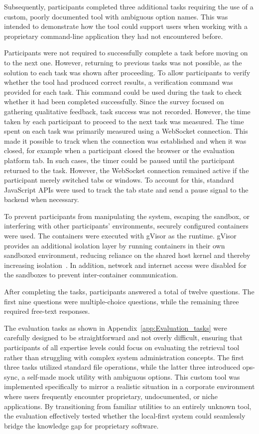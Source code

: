Subsequently, participants completed three additional tasks requiring the use of a custom, poorly documented tool with ambiguous option names. This was intended to demonstrate how the tool could support users when working with a proprietary command-line application they had not encountered before.

Participants were not required to successfully complete a task before moving on to the next one. However, returning to previous tasks was not possible, as the solution to each task was shown after proceeding. To allow participants to verify whether the tool had produced correct results, a verification command was provided for each task. This command could be used during the task to check whether it had been completed successfully. Since the survey focused on gathering qualitative feedback, task success was not recorded. However, the time taken by each participant to proceed to the next task was measured.
The time spent on each task was primarily measured using a WebSocket connection. This made it possible to track when the connection was established and when it was closed, for example when a participant closed the browser or the evaluation platform tab. In such cases, the timer could be paused until the participant returned to the task. However, the WebSocket connection remained active if the participant merely switched tabs or windows. To account for this, standard JavaScript APIs were used to track the tab state and send a pause signal to the backend when necessary.

To prevent participants from manipulating the system, escaping the sandbox, or interfering with other participants' environments, securely configured containers were used. The containers were executed with gVisor as the runtime. gVisor provides an additional isolation layer by running containers in their own sandboxed environment, reducing reliance on the shared host kernel and thereby increasing isolation~\cite{gvisor_docs}. In addition, network and internet access were disabled for the sandboxes to prevent inter-container communication.

After completing the tasks, participants answered a total of twelve questions. The first nine questions were multiple-choice questions, while the remaining three required free-text responses.

The evaluation tasks as shown in Appendix~\ref{app:Evaluation_tasks} were carefully designed to be straightforward and not overly difficult, ensuring that participants of all expertise levels could focus on evaluating the retrieval tool rather than struggling with complex system administration concepts. The first three tasks utilized standard file operations, while the latter three introduced ops-sync, a self-made mock utility with ambiguous options. This custom tool was implemented specifically to mirror a realistic situation in a corporate environment where users frequently encounter proprietary, undocumented, or niche applications. By transitioning from familiar utilities to an entirely unknown tool, the evaluation effectively tested whether the local-first system could seamlessly bridge the knowledge gap for proprietary software.

